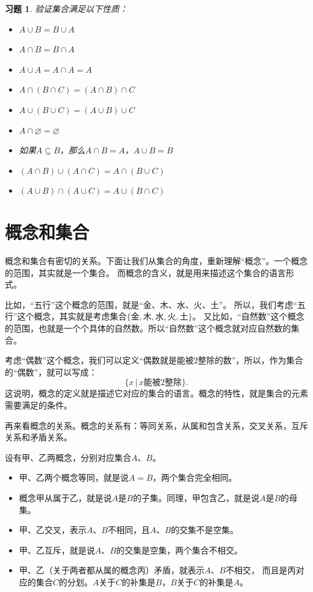 \documentclass[12pt,UTF8]{ctexbook}
\theoremstyle{definition}
\theoremstyle{plain}
\newtheorem{xt}{习题}[section]
\begin{document}
\begin{xt}\label{xt:2-1-0}
    验证集合满足以下性质：
    \begin{itemize}
        \item $A \cup B = B \cup A$
        \item $A \cap B = B \cap A$
        \item $A \cup A = A \cap A = A$
        \item $A \cap (B \cap C) = (A \cap B) \cap C$
        \item $A \cup (B \cup C) = (A \cup B) \cup C$
        \item $A \cap \varnothing = \varnothing$
        \item 如果$A \subseteq B$，那么$A \cap B = A$，$A \cup B = B$
        \item $(A \cap B) \cup (A \cap C) = A \cap (B \cup C)$
        \item $(A \cup B) \cap (A \cup C) = A \cup (B \cap C)$
    \end{itemize}  
\end{xt}

\section{概念和集合}

概念和集合有密切的关系。下面让我们从集合的角度，重新理解“概念”。一个概念的范围，其实就是一个集合。
而概念的含义，就是用来描述这个集合的语言形式。

比如，“五行”这个概念的范围，就是“金、木、水、火、土”。
所以，我们考虑“五行”这个概念，其实就是考虑集合$\{\mbox{金}, \mbox{木}, \mbox{水}, \mbox{火}, \mbox{土}\}$。
又比如，“自然数”这个概念的范围，也就是一个个具体的自然数。所以“自然数”这个概念就对应自然数的集合。

考虑“偶数”这个概念，我们可以定义“偶数就是能被$2$整除的数”，所以，作为集合的“偶数”，就可以写成：
$$ \{x \,|\,x \mbox{能被}2\mbox{整除} \}.$$
这说明，概念的定义就是描述它对应的集合的语言。概念的特性，就是集合的元素需要满足的条件。

再来看概念的关系。概念的关系有：等同关系，从属和包含关系，交叉关系，互斥关系和矛盾关系。

设有甲、乙两概念，分别对应集合$A$、$B$。
\begin{itemize}
    \item 甲、乙两个概念等同，就是说$A = B$，两个集合完全相同。
    \item 概念甲从属于乙，就是说$A$是$B$的子集。同理，甲包含乙，就是说$A$是$B$的母集。
    \item 甲、乙交叉，表示$A$、$B$不相同，且$A$、$B$的交集不是空集。
    \item 甲、乙互斥，就是说$A$、$B$的交集是空集，两个集合不相交。
    \item 甲、乙（关于两者都从属的概念丙）矛盾，就表示$A$、$B$不相交，
    而且是丙对应的集合$C$的分划。$A$关于$C$的补集是$B$，$B$关于$C$的补集是$A$。
\end{itemize}
\end{document}
